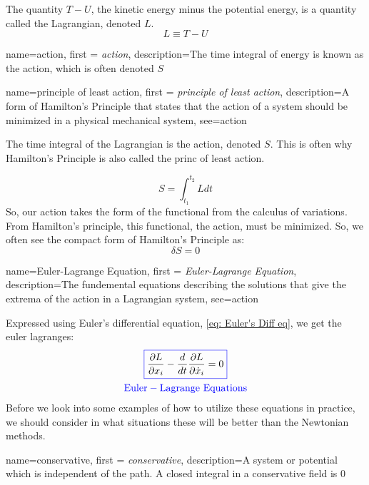 \documentclass[12pt]{report}
\begin{document}
The quantity $T-U$, the kinetic energy minus the potential energy, is a quantity called the \gls{Lagrangian}, denoted $L$. 
\begin{equation}
    L\equiv T-U
\end{equation}

{
    name=action,
    first = {\textit{action}},
    description={The time integral of energy is known as the action, which is often denoted $S$}
}

{
    name=principle of least action,
    first = {\textit{principle of least action}},
    description={A form of Hamilton's Principle that states that the action of a system should be minimized in a physical mechanical system},
    see={action}
}

The time integral of the \gls{Lagrangian} is the \gls{action}, denoted $S$. This is often why Hamilton's Principle is also called the \gls{princ of least action}. 

\begin{equation}
    S=\int_{t_1}^{t_2}{L}{dt}
\end{equation}
So, our \gls{action} takes the form of the \gls{functional} from the calculus of variations. From Hamilton's principle, this \gls{functional}, the \gls{action}, must be minimized. So, we often see the compact form of Hamilton's Principle as:
$$\delta S=0$$

{
    name=Euler-Lagrange Equation,
    first = {\textit{Euler-Lagrange Equation}},
    description={The fundemental equations describing the solutions that give the extrema of the action in a Lagrangian system},
    see={action}
}

Expressed using Euler's differential equation, \eqref{eq: Euler's Diff eq}, we get the \glspl{euler lagrange}:
\begin{gather}\label{eq: Euler-Lagrange}
    \color{blue}\boxed{\color{black}\frac{\partial L}{\partial x_i}-\frac{d}{dt}\frac{\partial L}{\partial \dot{x}_i}=0}\\ \mathrm{\color{blue}Euler-Lagrange \ Equations}
\end{gather}
Before we look into some examples of how to utilize these equations in practice, we should consider in what situations these will be better than the Newtonian methods.

{
    name=conservative,
    first = {\textit{conservative}},
    description={A system or potential which is independent of the path. A closed integral in a conservative field is 0}
}
\end{document}
